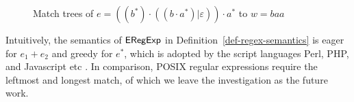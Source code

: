 \begin{example}
\begin{figure}[ht]
\caption{Match trees of $e=((b^\ast) \cdot ((b \cdot a^\ast) | \varepsilon)) \cdot a^\ast$ to $w= baa$}
\label{fig-regex-semantics}
\end{figure}
 \end{example}
  
\begin{remark}
Intuitively, the semantics of ${\sf ERegExp}$ in Definition~\ref{def-regex-semantics} is eager for $e_1 + e_2$ and greedy for $e^\ast$, which is adopted by the script languages Perl, PHP, and Javascript etc \cite{MasterREbook}. In comparison, POSIX regular expressions require the leftmost and longest match, of which we leave the investigation as the future work. 
\end{remark}
  
